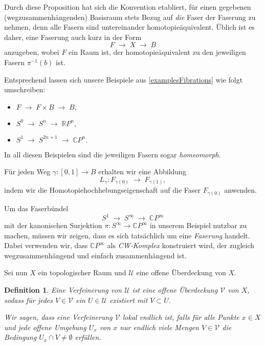 \documentclass[12pt, hidelinks]{article}
\numberwithin{conj}{section}
\newtheorem{definition}[conj]{Definition}
\begin{document}
\smallskip

Durch diese Proposition hat sich die Konvention etabliert, für einen gegebenen (wegzusammenhängenden) Basisraum stets Bezug auf \emph{die} Faser der Faserung zu nehmen, denn alle Fasern sind untereinander homotopieäquivalent. Üblich ist es daher, eine Faserung auch kurz in der Form
\[
    F \;\longrightarrow\; X \;\longrightarrow\; B
\]
anzugeben, wobei \(F\) ein Raum ist, der homotopieäquivalent zu den jeweiligen Fasern \(\pi^{-1}(b)\) ist.

\smallskip

Entsprechend lassen sich unsere Beispiele aus \autoref{examplesFibrations} wie folgt umschreiben:
\begin{itemize}[nolistsep]
    \item \(F \;\longrightarrow\; F \times B \;\longrightarrow\; B,\)
    \item \(S^0 \;\longrightarrow\; S^n \;\longrightarrow\; \mathbb{R}P^n,\)
    \item \(S^1 \;\longrightarrow\; S^{2n+1} \;\longrightarrow\; \mathbb{C}P^n.\)
\end{itemize}
In all diesen Beispielen sind die jeweiligen Fasern sogar \emph{homeomorph}. 

\noindent
Für jeden Weg \(\gamma : [0,1] \to B\) erhalten wir eine Abbildung 
\[
    L_\gamma : F_{\gamma(0)} \;\longrightarrow\; F_{\gamma(1)},
\]
indem wir die Homotopiehochhebungseigenschaft auf die Faser \(F_{\gamma(0)}\) anwenden.

\smallskip

Um das Faserbündel
\[
    S^1 \;\longrightarrow\; S^\infty \;\longrightarrow\; \mathbb{C}P^\infty
\]
mit der kanonischen Surjektion \(\pi : S^\infty \to \mathbb{C}P^\infty\) in unserem Beispiel nutzbar zu machen, müssen wir zeigen, dass es sich tatsächlich um eine \emph{Faserung} handelt. Dabei verwenden wir, dass \(\mathbb{C}P^\infty\) als \emph{CW-Komplex} konstruiert wird, der zugleich wegzusammenhängend und einfach zusammenhängend ist.

\smallskip

Sei nun \(X\) ein topologischer Raum und \(\mathcal{U}\) eine offene Überdeckung von \(X\).

\begin{definition}
    Eine \emph{Verfeinerung} von \(\mathcal{U}\) ist eine offene Überdeckung \(\mathcal{V}\) von \(X\), sodass für jedes \(V \in \mathcal{V}\) ein \(U \in \mathcal{U}\) existiert mit \(V \subset U\).

    Wir sagen, dass eine Verfeinerung \(\mathcal{V}\) \emph{lokal endlich} ist, falls für alle Punkte \(x \in X\) und jede offene Umgebung \(U_x\) von \(x\) nur endlich viele Mengen \(V \in \mathcal{V}\) die Bedingung \(U_x \cap V \neq \emptyset\) erfüllen.
\end{definition}
\end{document}
